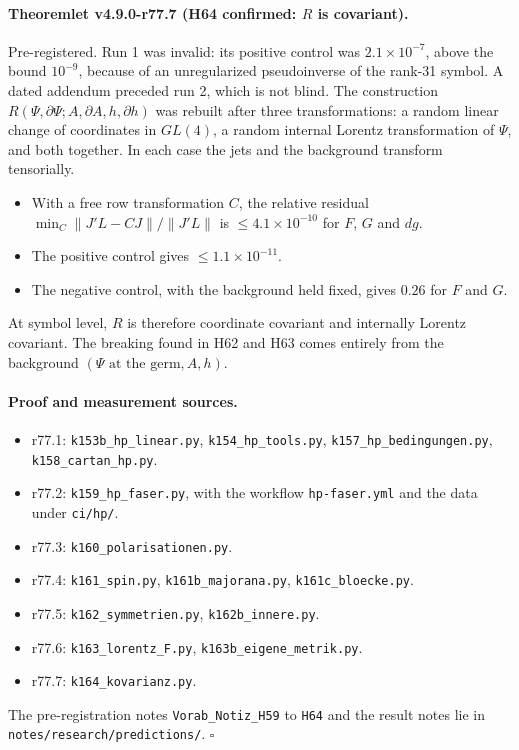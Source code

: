 \paragraph{Theoremlet v4.9.0-r77.7 (H64 confirmed: \(R\) is covariant).}
Pre-registered.  Run 1 was invalid: its positive control was \(2.1\times10^{-7}\), above the bound \(10^{-9}\), because of an
unregularized pseudoinverse of the rank-31 symbol.  A dated addendum preceded run 2, which is not blind.  The construction
\(R(\Psi,\partial\Psi;A,\partial A,h,\partial h)\) was rebuilt after three transformations: a random linear change of
coordinates in \(GL(4)\), a random internal Lorentz transformation of \(\Psi\), and both together.  In each case the jets and
the background transform tensorially.
\begin{itemize}[leftmargin=2em]
\item With a free row transformation \(C\), the relative residual \(\min_C\|J'L-CJ\|/\|J'L\|\) is
\(\le4.1\times10^{-10}\) for \(F\), \(G\) and \(dg\).
\item The positive control gives \(\le1.1\times10^{-11}\).
\item The negative control, with the background held fixed, gives \(0.26\) for \(F\) and \(G\).
\end{itemize}
At symbol level, \(R\) is therefore coordinate covariant and internally Lorentz covariant.  The breaking found in H62 and H63
comes entirely from the background \((\Psi\text{ at the germ},A,h)\).

\paragraph{Proof and measurement sources.}
\begin{itemize}[leftmargin=2em]
\item r77.1: \texttt{k153b\_hp\_linear.py}, \texttt{k154\_hp\_tools.py}, \texttt{k157\_hp\_bedingungen.py},
\texttt{k158\_cartan\_hp.py}.
\item r77.2: \texttt{k159\_hp\_faser.py}, with the workflow \texttt{hp-faser.yml} and the data under \texttt{ci/hp/}.
\item r77.3: \texttt{k160\_polarisationen.py}.
\item r77.4: \texttt{k161\_spin.py}, \texttt{k161b\_majorana.py}, \texttt{k161c\_bloecke.py}.
\item r77.5: \texttt{k162\_symmetrien.py}, \texttt{k162b\_innere.py}.
\item r77.6: \texttt{k163\_lorentz\_F.py}, \texttt{k163b\_eigene\_metrik.py}.
\item r77.7: \texttt{k164\_kovarianz.py}.
\end{itemize}
The pre-registration notes \texttt{Vorab\_\allowbreak Notiz\_\allowbreak H59} to \texttt{H64} and the result notes lie in
\texttt{notes/\allowbreak research/\allowbreak predictions/}.  \(\square\)

